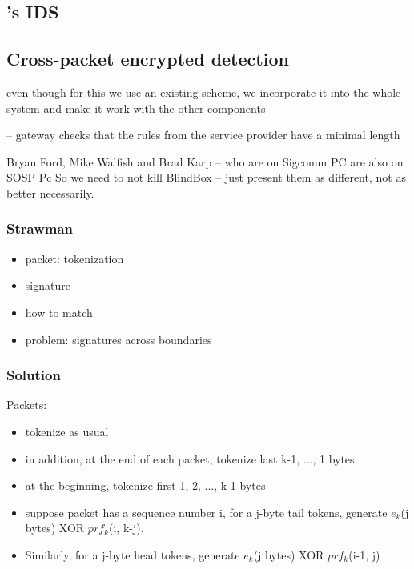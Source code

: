 \subsection{\sys's IDS}\label{sec:IDS}




\subsection{Cross-packet encrypted detection}



even though for this we use an existing scheme, we incorporate it into the whole
system and make it work with the other components

-- gateway checks that the rules from the service provider have a minimal length 

Bryan Ford, Mike Walfish and Brad Karp -- who are on Sigcomm PC are also on SOSP Pc
So we need to not kill BlindBox -- just present them as different, not as better necessarily.


\subsubsection{Strawman}
\begin{itemize}
\item packet: tokenization
\item signature
\item how to match
\item problem: signatures across boundaries
\end{itemize}

\subsubsection{Solution}
Packets:
\begin{itemize}
\item tokenize as usual
\item in addition, at the end of each packet, tokenize last k-1, ..., 1 bytes
\item at the beginning, tokenize first 1, 2, ..., k-1 bytes
\item suppose packet has a sequence number i, for a j-byte tail tokens, generate $e_k$(j bytes) XOR $prf_k$(i, k-j).
\item Similarly, for a j-byte head tokens, generate $e_k$(j bytes) XOR $prf_k$(i-1, j)
\end{itemize}

